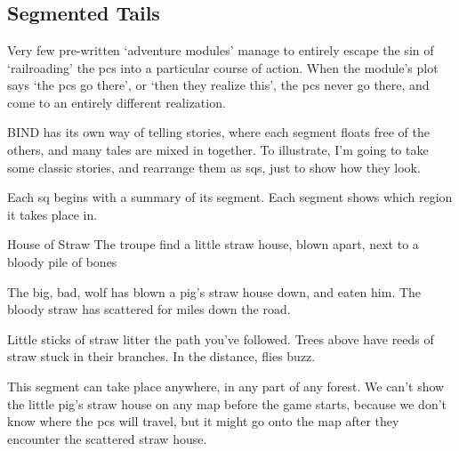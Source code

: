 \chapter{}

\label{sidequests}

\togglefalse{genExamples}

\section{Segmented Tails}

\begin{multicols}{2}

\noindent
Very few pre-written `adventure modules' manage to entirely escape the sin of `railroading' the \glspl{pc} into a particular course of action.
When the module's plot says `the \glspl{pc} go there', or `then they realize this', the \glspl{pc} never go there, and come to an entirely different realization.

BIND has its own way of telling stories, where each \gls{segment} floats free of the others, and many tales are mixed in together.
To illustrate, I'm going to take some classic stories, and rearrange them as \glspl{sq}, just to show how they look.


\noindent
Each \gls{sq} begins with a summary of its \gls{segment}.
Each \gls{segment} shows which \gls{region} it takes place in.

{House of Straw}%
{The troupe find a little straw house, blown apart, next to a bloody pile of bones}%

\begin{exampletext}
  The big, bad, wolf has blown a pig's straw house down, and eaten him.
  The bloody straw has scattered for miles down the road.
\end{exampletext}

\begin{boxtext}
  Little sticks of straw litter the path you've followed.
  Trees above have reeds of straw stuck in their branches.
  In the distance, flies buzz.
\end{boxtext}

This \gls{segment} can take place anywhere, in any part of any forest.
We can't show the little pig's straw house on any map before the game starts, because we don't know where the \glspl{pc} will travel, but it might go onto the map after they encounter the scattered straw house.


\end{multicols}
